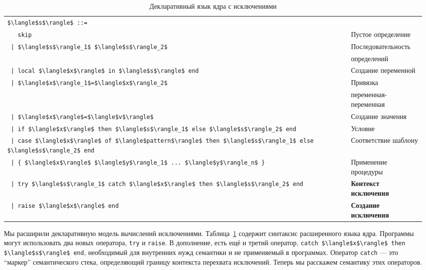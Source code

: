 \begin{table}
  \begin{tabular}{|ll|}
    \hline
    \lstinline|$\langle$s$\rangle$ ::=| & \\
    \lstinline|   skip| & Пустое определение \\
    \lstinline! | $\langle$s$\rangle_1$ $\langle$s$\rangle_2$! & Последовательность\\
    & определений \\
    \lstinline! | local $\langle$x$\rangle$ in $\langle$s$\rangle$ end! & Создание переменной \\
    \lstinline! | $\langle$x$\rangle_1$=$\langle$x$\rangle_2$! & Привязка \\
    & переменная-переменная \\
    \lstinline! | $\langle$x$\rangle$=$\langle$v$\rangle$! & Создание значения \\
    \lstinline! | if $\langle$x$\rangle$ then $\langle$s$\rangle_1$ else $\langle$s$\rangle_2$ end! & Условие \\
    \lstinline! | case $\langle$x$\rangle$ of $\langle$pattern$\rangle$ then $\langle$s$\rangle_1$ else $\langle$s$\rangle_2$ end! & Соответствие шаблону \\
    \lstinline! | { $\langle$x$\rangle$ $\langle$y$\rangle_1$ ... $\langle$y$\rangle_n$ }! & Применение процедуры \\
    \lstinline! | try $\langle$s$\rangle_1$ catch $\langle$x$\rangle$ then $\langle$s$\rangle_2$ end! & \textbf{Контекст исключения} \\
    \lstinline! | raise $\langle$x$\rangle$ end! & \textbf{Создание исключения} \\
    \hline
  \end{tabular}
\caption{Декларативный язык ядра с исключениями}
\label{table:declarative_kernel_language_with_exceptions}
\end{table}

Мы расширили декларативную модель вычислений исключениями. Таблица~\ref{table:declarative_kernel_language_with_exceptions} содержит синтаксис расширенного языка ядра. Программы могут использовать два новых оператора, \lstinline|try| и \lstinline|raise|. В дополнение, есть ещё и третий оператор, \lstinline|catch $\langle$x$\rangle$ then $\langle$s$\rangle$ end|, необходимый для внутренних нужд семантики и не применяемый в программах. Оператор \lstinline|catch| --- это ``маркер'' семантического стека, определяющий границу контекста перехвата исключений. Теперь мы расскажем семантику этих операторов.

